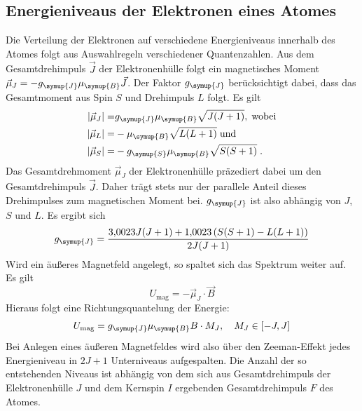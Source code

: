 \documentclass[
  bibliography=totoc,     %
  captions=tableheading,  %
  titlepage=firstiscover, %
]{scrartcl}
\begin{document}
\subsection{Energieniveaus der Elektronen eines Atomes}
%
Die Verteilung der Elektronen auf verschiedene Energieniveaus innerhalb des
Atomes folgt aus Auswahlregeln verschiedener Quantenzahlen. Aus dem
Gesamtdrehimpuls $\vec{J}$ der Elektronenhülle folgt ein magnetisches Moment
$\vec{\mu}_J=-g_{\symup{J}}\mu_{\symup{B}}\vec{J}$. Der Faktor $g_{\symup{J}}$
berücksichtigt dabei, dass das Gesamtmoment aus Spin $S$ und Drehimpuls $L$
folgt. Es gilt
%
\begin{align*}
  |\vec{\mu}_J|=&g_{\symup{J}}\mu_{\symup{B}}\sqrt{J(J+1)},\;\text{wobei} \\
  |\vec{\mu}_L|=&-\mu_{\symup{B}}\sqrt{L(L+1)}\;\text{und} \\
  |\vec{\mu}_S|=&-g_{\symup{S}}\mu_{\symup{B}}\sqrt{S(S+1)}\;.
\end{align*}
%
Das Gesamtdrehmoment $\vec{\mu}_J$ der Elektronenhülle präzediert dabei um den
Gesamtdrehimpuls $\vec{J}$. Daher trägt stets nur der parallele Anteil dieses
Drehimpulses zum magnetischen Moment bei. $g_{\symup{J}}$ ist also abhängig von
$J$, $S$ und $L$. Es ergibt sich
%
\begin{equation}
  g_{\symup{J}}=\frac{\num{3.0023}J(J+1)+\num{1.0023}\left(S(S+1)-L(L+1)\right)}{2J(J+1)}
  \label{eq:gj}
\end{equation}
%
Wird ein äußeres Magnetfeld angelegt, so spaltet sich das
Spektrum weiter auf. Es gilt
%
\begin{equation}
  U_\text{mag}=-\vec{\mu}_J\cdot\vec{B}
\end{equation}
%
Hieraus folgt eine Richtungsquantelung der Energie:
%
\begin{equation}
  U_\text{mag}=g_{\symup{J}}\mu_{\symup{B}}B\cdot M_J,\quad M_J\in[-J,J]
\end{equation}
%
Bei Anlegen eines äußeren Magnetfeldes wird also über den Zeeman-Effekt jedes
Energieniveau in $2J+1$ Unterniveaus aufgespalten. Die Anzahl der so
entstehenden Niveaus ist abhängig von dem sich aus Gesamtdrehimpuls der
Elektronenhülle $J$ und dem Kernspin $I$ ergebenden Gesamtdrehimpuls $F$ des
Atomes.
%
\end{document}
